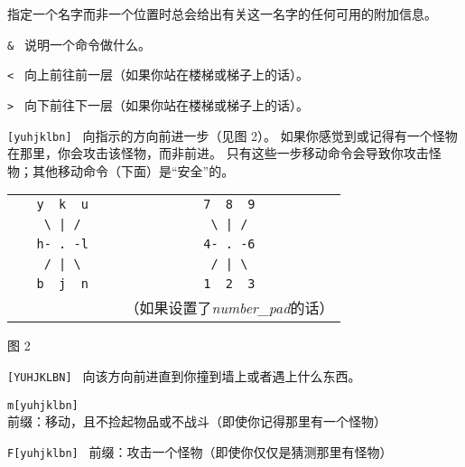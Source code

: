 \documentclass[a4paper, 10pt]{article}
\newcommand{\tb}[1]{\tt #1 \hfill}
\begin{document}
指定一个名字而非一个位置时总会给出有关这一名字的任何可用的附加信息。
\item[\tb{\&}]
说明一个命令做什么。
\item[\tb{<}]
向上前往前一层（如果你站在楼梯或梯子上的话）。
\item[\tb{>}]
向下前往下一层（如果你站在楼梯或梯子上的话）。
\item[\tb{[yuhjklbn]}]
向指示的方向前进一步（见图 2）。
如果你感觉到或记得有一个怪物在那里，你会攻击该怪物，而非前进。
只有这些一步移动命令会导致你攻击怪物；其他移动命令（下面）是“安全”的。
\begin{center}
\begin{tabular}{cc}
\verb+   y  k  u   + & \verb+   7  8  9   +\\
\verb+    \ | /    + & \verb+    \ | /    +\\
\verb+   h- . -l   + & \verb+   4- . -6   +\\
\verb+    / | \    + & \verb+    / | \    +\\
\verb+   b  j  n   + & \verb+   1  2  3   +\\
                     & （如果设置了{\it number\_pad\/}的话）
\end{tabular}
\end{center}
\begin{center}
图 2
\end{center}
\item[\tb{[YUHJKLBN]}]
向该方向前进直到你撞到墙上或者遇上什么东西。
\item[\tb{m[yuhjklbn]}]
前缀：移动，且不捡起物品或不战斗（即使你记得那里有一个怪物）
\item[\tb{F[yuhjklbn]}]
前缀：攻击一个怪物（即使你仅仅是猜测那里有怪物）
\end{document}
